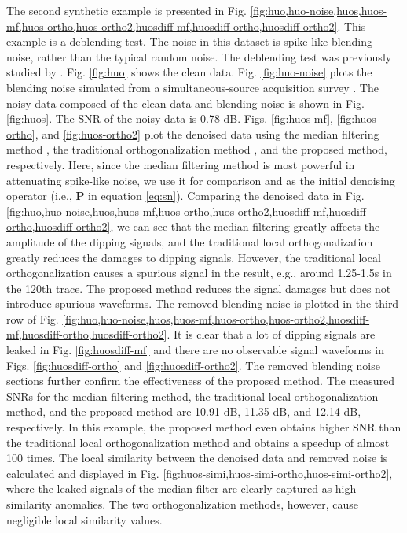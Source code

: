 The second synthetic example is presented in Fig. \ref{fig:huo,huo-noise,huos,huos-mf,huos-ortho,huos-ortho2,huosdiff-mf,huosdiff-ortho,huosdiff-ortho2}. This example is a deblending test. The noise in this dataset is spike-like blending noise, rather than the typical random noise. The deblending test was previously studied by \cite{yangkang2015ortho}. Fig. \ref{fig:huo} shows the clean data. Fig. \ref{fig:huo-noise} plots the blending noise simulated from a simultaneous-source acquisition survey \cite{yangkang20142}. The noisy data composed of the clean data and blending noise is shown in Fig. \ref{fig:huos}. The SNR of the noisy data is 0.78 dB. Figs. \ref{fig:huos-mf}, \ref{fig:huos-ortho}, and \ref{fig:huos-ortho2} plot the denoised data using the median filtering method \cite{justusson1981median}, the traditional orthogonalization method \cite{yangkang2015ortho}, and the proposed method, respectively. Here, since the median filtering method is most powerful in attenuating spike-like noise, we use it for comparison and as the initial denoising operator (i.e., $\mathbf{P}$ in equation \ref{eq:sn}).  Comparing the denoised data in Fig. \ref{fig:huo,huo-noise,huos,huos-mf,huos-ortho,huos-ortho2,huosdiff-mf,huosdiff-ortho,huosdiff-ortho2}, we can see that the median filtering greatly affects the amplitude of the dipping signals, and the traditional local orthogonalization greatly reduces the damages to dipping signals. However, the traditional local orthogonalization causes a spurious signal in the result, e.g., around 1.25-1.5s in the 120th trace. The proposed method reduces the signal damages but does not introduce spurious waveforms. The removed blending noise is plotted in the third row of Fig. \ref{fig:huo,huo-noise,huos,huos-mf,huos-ortho,huos-ortho2,huosdiff-mf,huosdiff-ortho,huosdiff-ortho2}. It is clear that a lot of dipping signals are leaked in Fig. \ref{fig:huosdiff-mf} and there are no observable signal waveforms in Figs. \ref{fig:huosdiff-ortho} and \ref{fig:huosdiff-ortho2}. The removed blending noise sections further confirm the effectiveness of the proposed method. The measured SNRs for the median filtering method, the traditional local orthogonalization method, and the proposed method are 10.91 dB, 11.35 dB, and 12.14 dB, respectively. In this example, the proposed method even obtains higher SNR than the traditional local orthogonalization method and obtains a speedup of almost 100 times. The local similarity between the denoised data and removed noise is calculated and displayed in Fig. \ref{fig:huos-simi,huos-simi-ortho,huos-simi-ortho2}, where the leaked signals of the median filter are clearly captured as high similarity anomalies. The two orthogonalization methods, however, cause negligible local similarity values. 



